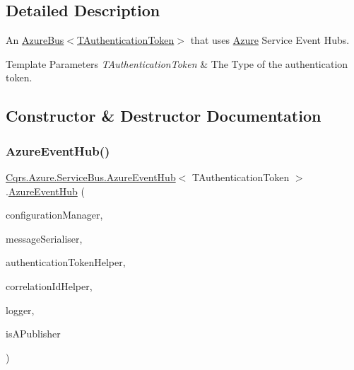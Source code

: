 \subsection{Detailed Description}
An \hyperlink{classCqrs_1_1Azure_1_1ServiceBus_1_1AzureBus_a1046ff74282fd178f43e28420433d2a9_a1046ff74282fd178f43e28420433d2a9}{Azure\+Bus$<$\+T\+Authentication\+Token$>$} that uses \hyperlink{namespaceCqrs_1_1Azure}{Azure} Service Event Hubs. 


\begin{DoxyTemplParams}{Template Parameters}
{\em T\+Authentication\+Token} & The Type of the authentication token.\\
\hline
\end{DoxyTemplParams}


\subsection{Constructor \& Destructor Documentation}
\mbox{\label{classCqrs_1_1Azure_1_1ServiceBus_1_1AzureEventHub_adef2c26639ae4a7725c397da7fd90000_adef2c26639ae4a7725c397da7fd90000}} 
\subsubsection{\texorpdfstring{Azure\+Event\+Hub()}{AzureEventHub()}}
{\footnotesize\ttfamily \hyperlink{classCqrs_1_1Azure_1_1ServiceBus_1_1AzureEventHub}{Cqrs.\+Azure.\+Service\+Bus.\+Azure\+Event\+Hub}$<$ T\+Authentication\+Token $>$.\hyperlink{classCqrs_1_1Azure_1_1ServiceBus_1_1AzureEventHub}{Azure\+Event\+Hub} (\begin{DoxyParamCaption}\item[{\hyperlink{interfaceCqrs_1_1Configuration_1_1IConfigurationManager}{I\+Configuration\+Manager}}]{configuration\+Manager,  }\item[{\hyperlink{interfaceCqrs_1_1Azure_1_1ServiceBus_1_1IMessageSerialiser}{I\+Message\+Serialiser}$<$ T\+Authentication\+Token $>$}]{message\+Serialiser,  }\item[{\hyperlink{interfaceCqrs_1_1Authentication_1_1IAuthenticationTokenHelper}{I\+Authentication\+Token\+Helper}$<$ T\+Authentication\+Token $>$}]{authentication\+Token\+Helper,  }\item[{I\+Correlation\+Id\+Helper}]{correlation\+Id\+Helper,  }\item[{I\+Logger}]{logger,  }\item[{bool}]{is\+A\+Publisher }\end{DoxyParamCaption})\hspace{0.3cm}{\ttfamily [protected]}}



